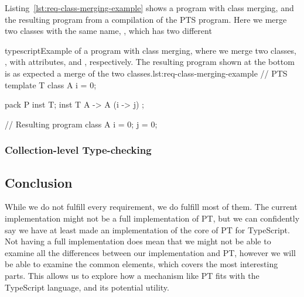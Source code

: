 Listing~\vref{lst:req-class-merging-example} shows a program with class merging, and the resulting program from a compilation of the PTS program.
Here we merge two classes with the same name, , which has two different

\begin{code}{typescript}{Example of a program with class merging, where we merge two classes, , with attributes,  and , respectively. The resulting program shown at the bottom is as expected a merge of the two classes.}{lst:req-class-merging-example}
    // PTS
    template T {
        class A {
            i = 0;
        }
    }

    pack P {
        inst T;
        inst T { A -> A (i -> j) };
    }

    // Resulting program
    class A {
        i = 0;
        j = 0;
    }
\end{code}

\subsubsection{Collection-level Type-checking}\label{subsubsec:implementation-collection-level-type-checking}

\subsection{Conclusion}\label{subsec:requirements-conclusion}

While we do not fulfill every requirement, we do fulfill most of them.
The current implementation might not be a full implementation of PT, but we can confidently say we have at least made an implementation of the core of PT for TypeScript.
Not having a full implementation does mean that we might not be able to examine all the differences between our implementation and PT, however we will be able to examine the common elements, which covers the most interesting parts.
This allows us to explore how a mechanism like PT fits with the TypeScript language, and its potential utility.